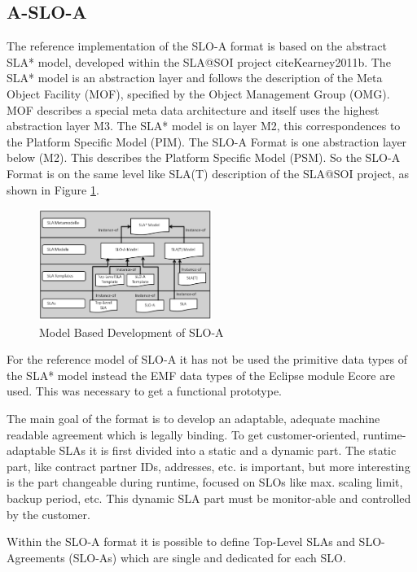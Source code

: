 \subsection{A-SLO-A}
The reference implementation of the SLO-A format is based on the abstract SLA* model, developed within the SLA@SOI project cite{Kearney2011b}. The SLA* model is an abstraction layer and follows the description of the Meta Object Facility (MOF), specified by the Object Management Group (OMG). MOF describes a special meta data architecture and itself uses the highest abstraction layer M3. The SLA* model is on layer M2, this correspondences to the Platform Specific Model (PIM). The SLO-A Format is one abstraction layer below (M2). This describes the Platform Specific Model (PSM). So the SLO-A Format is on the same level like SLA(T) description of the SLA@SOI project, as shown in Figure \ref{fig:mbd_SLOA}.
\begin{figure}[ht]
		\centering
\includegraphics[width=0.5\textwidth]{fig/Modellbasierte_Entwicklung_Instanz.png}
\caption{Model Based Development of SLO-A}
\label{fig:mbd_SLOA}
\end{figure}
For the reference model of SLO-A it has not be used the primitive data types of the SLA* model instead the EMF data types of the Eclipse module Ecore are used. This was necessary to get a functional prototype.

The main goal of the format is to develop an adaptable, adequate machine readable agreement which is legally binding. To get customer-oriented, runtime-adaptable SLAs it is first divided into a static and a dynamic part. The static part, like contract partner IDs, addresses, etc. is important, but more interesting is the part changeable during runtime, focused on SLOs like max. scaling limit, backup period, etc. This dynamic SLA part must be monitor-able and controlled by the customer.

Within the SLO-A format it is possible to define Top-Level SLAs and SLO-Agreements (SLO-As) which are single and dedicated for each SLO.

